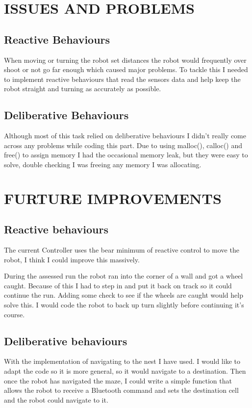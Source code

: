\documentclass[11pt,a4paper,titlepage]{article}
\begin{document}
    \section{ISSUES AND PROBLEMS}
            \subsection{Reactive Behaviours}
                When moving or turning the robot set distances the robot would frequently over shoot or not go far enough which caused major problems.
                To tackle this I needed to implement reactive behaviours that read the sensors data and help keep the robot straight and turning as accurately as possible.
            \subsection{Deliberative Behaviours}
                Although most of this task relied on deliberative behaviours I didn't really come across any problems while coding this part. 
                Due to using malloc(), calloc() and free() to assign memory I had the occasional memory leak, but they were easy to solve, double checking I was freeing any memory I was allocating.
    \section{FURTURE IMPROVEMENTS}
            \subsection{Reactive behaviours}
                The current Controller uses the bear minimum of reactive control to move the robot, I think I could improve this massively. 

                During the assessed run the robot ran into the corner of a wall and got a wheel caught. 
                Because of this I had to step in and put it back on track so it could continue the run. 
                Adding some check to see if the wheels are caught would help solve this.
                I would code the robot to back up turn slightly before continuing it's course.
            \subsection{Deliberative behaviours}
                With the implementation of navigating to the nest I have used. 
                I would like to adapt the code so it is more general, so it would navigate to a destination. 
                Then once the robot has navigated the maze, I could write a simple function that allows the robot to receive a Bluetooth command and sets the destination cell and the robot could navigate to it.
    
\end{document}
